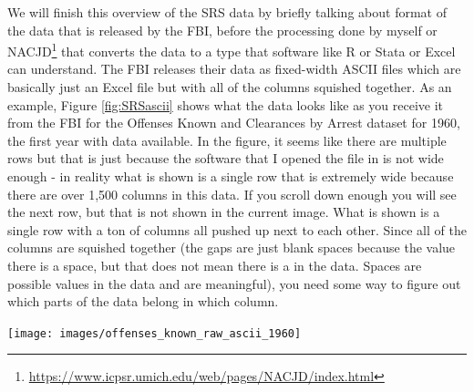 \documentclass[
]{krantz}
\let\origfigure\figure
\let\endorigfigure\endfigure
\renewenvironment{figure}[1][2] {
    \expandafter\origfigure\expandafter[H]
} {
    \endorigfigure
}
\renewcommand{\href}[2]{#2\footnote{\url{#1}}}
\begin{document}
We will finish this overview of the SRS data by briefly
talking about format of the data that is released by the
FBI, before the processing done by myself or
\href{https://www.icpsr.umich.edu/web/pages/NACJD/index.html}{NACJD}
that converts the data to a type that software like R or
Stata or Excel can understand. The FBI releases their data
as fixed-width ASCII files which are basically just an Excel
file but with all of the columns squished together. As an
example, Figure \ref{fig:SRSascii} shows what the data looks
like as you receive it from the FBI for the Offenses Known
and Clearances by Arrest dataset for 1960, the first year
with data available. In the figure, it seems like there are
multiple rows but that is just because the software that I
opened the file in is not wide enough - in reality what is
shown is a single row that is extremely wide because there
are over 1,500 columns in this data. If you scroll down
enough you will see the next row, but that is not shown in
the current image. What is shown is a single row with a ton
of columns all pushed up next to each other. Since all of
the columns are squished together (the gaps are just blank
spaces because the value there is a space, but that does not
mean there is a in the data. Spaces are possible values in
the data and are meaningful), you need some way to figure
out which parts of the data belong in which column.

\begin{figure}

{\centering \texttt{[image: images/offenses\_known\_raw\_ascii\_1960]} 

}

\caption{Fixed-width ASCII file for the 1960 Offenses Known and Clearances by Arrest dataset.}\label{fig:SRSascii}
\end{figure}
\end{document}
